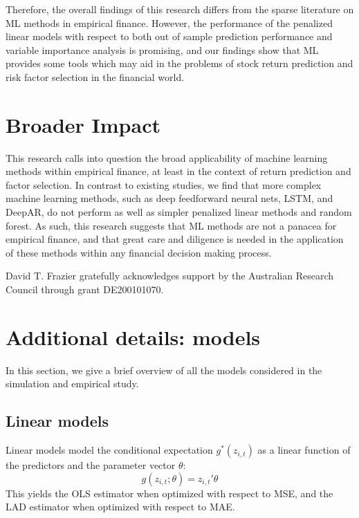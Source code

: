 \documentclass{article}
\begin{document}
Therefore, the overall findings of this research differs from the sparse literature on ML methods in empirical finance. However, the performance of the penalized linear models with respect to both out of sample prediction performance and variable importance analysis is promising, and our findings show that ML provides some tools which may aid in the problems of stock return prediction and risk factor selection in the financial world. 

\section*{Broader Impact}
This research calls into question the broad applicability of machine learning methods within empirical finance, at least in the context of return prediction and factor selection. In contrast to existing studies, we find that more complex machine learning methods, such as deep feedforward neural nets, LSTM, and DeepAR, do not perform as well as simpler penalized linear methods and random forest. As such, this research suggests that ML methods are not a panacea for empirical finance, and that great care and diligence is needed in the application of these methods within any financial decision making process. 

\begin{ack}
	David T. Frazier gratefully acknowledges support by the Australian Research Council through grant DE200101070.
\end{ack}




\appendix 

\section{Additional details: models}\label{app:models}
In this section, we give a brief overview of all the models considered in the simulation and empirical study.

\subsection{Linear models}
Linear models model the conditional expectation \( g^*(z_{i, t}) \) as a linear function of the predictors and the parameter vector \( \theta \):
\begin{equation}
g(z_{i, t};\theta) = z_{i, t}' \theta
\end{equation}
This yields the OLS estimator when optimized with respect to MSE, and the LAD estimator when optimized with respect to MAE.
\end{document}
